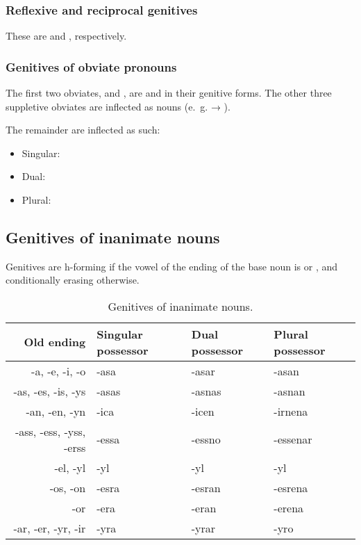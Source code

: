 \documentclass{book}
\begin{document}
\subsubsection{Reflexive and reciprocal genitives}

These are  and , respectively.

\subsubsection{Genitives of obviate pronouns}

The first two obviates,  and , are  and  in their genitive forms.  The other three suppletive obviates are inflected as nouns (e.~g.  → ).

The remainder are inflected as such:

\begin{itemize}
	\item Singular: 
	\item Dual: 
	\item Plural: 
\end{itemize}

\subsection{Genitives of inanimate nouns}

Genitives are h-forming if the vowel of the ending of the base noun is  or , and conditionally erasing otherwise.

\begin{table}[H]
  \caption{Genitives of inanimate nouns.}
  \centering
  \begin{tabular}{|r|l|l|l|}
    \hline
    Old ending & Singular possessor & Dual possessor & Plural possessor \\ \hline
    -a, -e, -i, -o & -asa & -asar & -asan \\
    -as, -es, -is, -ys & -asas & -asnas & -asnan \\
    -an, -en, -yn & -ica & -icen & -irnena \\
    -ass, -ess, -yss, -erss & -essa & -essno & -essenar \\
    -el, -yl & -yl & -yl & -yl \\
    -os, -on & -esra & -esran & -esrena \\
    -or & -era & -eran & -erena \\
    -ar, -er, -yr, -ir & -yra & -yrar & -yro \\ \hline
  \end{tabular}
\end{table}
\end{document}
